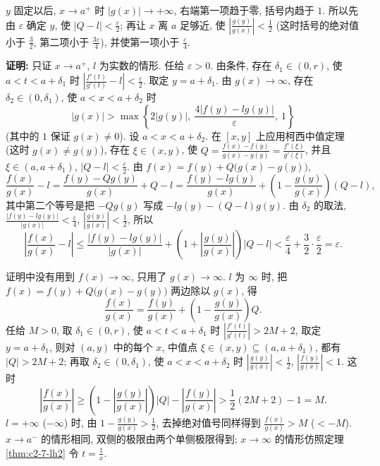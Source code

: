 \documentclass[UTF8,openany]{ctexbook}
\theoremstyle{chinesetextbook}
\newenvironment{cnproof}{\par\indent\textbf{证明:} \ignorespaces}{\par}
\begin{document}
$y$ 固定以后, $x\to a^+$ 时 $|g(x)|\to+\infty$, 右端第一项趋于零, 括号内趋于 $1$. 所以先由 $\varepsilon$ 确定 $y$, 使 $\displaystyle|Q-l|<\frac\varepsilon2$; 再让 $x$ 离 $a$ 足够近, 使 $\displaystyle\left|\frac{g(y)}{g(x)}\right|<\frac12$ (这时括号的绝对值小于 $\displaystyle\frac32$, 第二项小于 $\displaystyle\frac{3\varepsilon}4$), 并使第一项小于 $\displaystyle\frac\varepsilon4$.
\begin{cnproof}
只证 $x\to a^+$, $l$ 为实数的情形. 任给 $\varepsilon>0$. 由条件, 存在 $\delta_1\in(0,r)$, 使 $a<t<a+\delta_1$ 时 $\displaystyle\left|\frac{f'(t)}{g'(t)}-l\right|<\frac\varepsilon2$. 取定 $y=a+\delta_1$. 由 $g(x)\to\infty$, 存在 $\delta_2\in(0,\delta_1)$, 使 $a<x<a+\delta_2$ 时
\[
|g(x)|>\max\left\{2|g(y)|,\ \frac{4|f(y)-lg(y)|}\varepsilon,\ 1\right\}
\]
(其中的 $1$ 保证 $g(x)\ne0$). 设 $a<x<a+\delta_2$. 在 $[x,y]$ 上应用柯西中值定理 (这时 $g(x)\ne g(y)$), 存在 $\xi\in(x,y)$, 使 $\displaystyle Q=\frac{f(x)-f(y)}{g(x)-g(y)}=\frac{f'(\xi)}{g'(\xi)}$, 并且 $\xi\in(a,a+\delta_1)$, $\displaystyle|Q-l|<\frac\varepsilon2$. 由 $f(x)=f(y)+Q\bigl(g(x)-g(y)\bigr)$,
\[
\frac{f(x)}{g(x)}-l=\frac{f(y)-Qg(y)}{g(x)}+Q-l=\frac{f(y)-lg(y)}{g(x)}+\left(1-\frac{g(y)}{g(x)}\right)(Q-l),
\]
其中第二个等号是把 $-Qg(y)$ 写成 $-lg(y)-(Q-l)g(y)$. 由 $\delta_2$ 的取法, $\displaystyle\frac{|f(y)-lg(y)|}{|g(x)|}<\frac\varepsilon4$, $\displaystyle\left|\frac{g(y)}{g(x)}\right|<\frac12$, 所以
\[
\left|\frac{f(x)}{g(x)}-l\right|\le\frac{|f(y)-lg(y)|}{|g(x)|}+\left(1+\left|\frac{g(y)}{g(x)}\right|\right)|Q-l|<\frac\varepsilon4+\frac32\cdot\frac\varepsilon2=\varepsilon.
\]
\end{cnproof}
证明中没有用到 $f(x)\to\infty$, 只用了 $g(x)\to\infty$. $l$ 为 $\infty$ 时, 把 $f(x)=f(y)+Q\bigl(g(x)-g(y)\bigr)$ 两边除以 $g(x)$, 得
\[
\frac{f(x)}{g(x)}=\frac{f(y)}{g(x)}+\left(1-\frac{g(y)}{g(x)}\right)Q.
\]
任给 $M>0$, 取 $\delta_1\in(0,r)$, 使 $a<t<a+\delta_1$ 时 $\displaystyle\left|\frac{f'(t)}{g'(t)}\right|>2M+2$, 取定 $y=a+\delta_1$, 则对 $(a,y)$ 中的每个 $x$, 中值点 $\xi\in(x,y)\subseteq(a,a+\delta_1)$, 都有 $|Q|>2M+2$; 再取 $\delta_2\in(0,\delta_1)$, 使 $a<x<a+\delta_2$ 时 $\displaystyle\left|\frac{g(y)}{g(x)}\right|<\frac12$, $\displaystyle\left|\frac{f(y)}{g(x)}\right|<1$. 这时
\[
\left|\frac{f(x)}{g(x)}\right|\ge\left(1-\left|\frac{g(y)}{g(x)}\right|\right)|Q|-\left|\frac{f(y)}{g(x)}\right|>\frac12(2M+2)-1=M.
\]
$l=+\infty$ ($-\infty$) 时, 由 $\displaystyle1-\frac{g(y)}{g(x)}>\frac12$, 去掉绝对值号同样得到 $\displaystyle\frac{f(x)}{g(x)}>M$ ($<-M$). $x\to a^-$ 的情形相同, 双侧的极限由两个单侧极限得到; $x\to\infty$ 的情形仿照定理\ref{thm:c2-7-lh2} 令 $\displaystyle t=\frac1x$.
\end{document}

